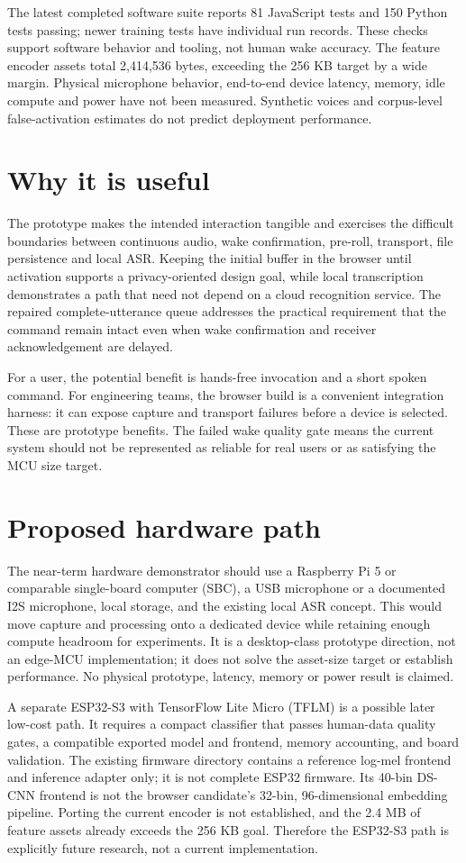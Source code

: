 \documentclass[11pt]{article}
\begin{document}
The latest completed software suite reports 81 JavaScript tests and 150 Python tests passing; newer training tests have individual run records. These checks support software behavior and tooling, not human wake accuracy. The feature encoder assets total 2,414,536 bytes, exceeding the 256 KB target by a wide margin. Physical microphone behavior, end-to-end device latency, memory, idle compute and power have not been measured. Synthetic voices and corpus-level false-activation estimates do not predict deployment performance.
\section{Why it is useful}
The prototype makes the intended interaction tangible and exercises the difficult boundaries between continuous audio, wake confirmation, pre-roll, transport, file persistence and local ASR. Keeping the initial buffer in the browser until activation supports a privacy-oriented design goal, while local transcription demonstrates a path that need not depend on a cloud recognition service. The repaired complete-utterance queue addresses the practical requirement that the command remain intact even when wake confirmation and receiver acknowledgement are delayed.

For a user, the potential benefit is hands-free invocation and a short spoken command. For engineering teams, the browser build is a convenient integration harness: it can expose capture and transport failures before a device is selected. These are prototype benefits. The failed wake quality gate means the current system should not be represented as reliable for real users or as satisfying the MCU size target.
\section{Proposed hardware path}
The near-term hardware demonstrator should use a Raspberry Pi 5 or comparable single-board computer (SBC), a USB microphone or a documented I2S microphone, local storage, and the existing local ASR concept. This would move capture and processing onto a dedicated device while retaining enough compute headroom for experiments. It is a desktop-class prototype direction, not an edge-MCU implementation; it does not solve the asset-size target or establish performance. No physical prototype, latency, memory or power result is claimed.

A separate ESP32-S3 with TensorFlow Lite Micro (TFLM) is a possible later low-cost path. It requires a compact classifier that passes human-data quality gates, a compatible exported model and frontend, memory accounting, and board validation. The existing firmware directory contains a reference log-mel frontend and inference adapter only; it is not complete ESP32 firmware. Its 40-bin DS-CNN frontend is not the browser candidate's 32-bin, 96-dimensional embedding pipeline. Porting the current encoder is not established, and the 2.4 MB of feature assets already exceeds the 256 KB goal. Therefore the ESP32-S3 path is explicitly future research, not a current implementation.
\end{document}
